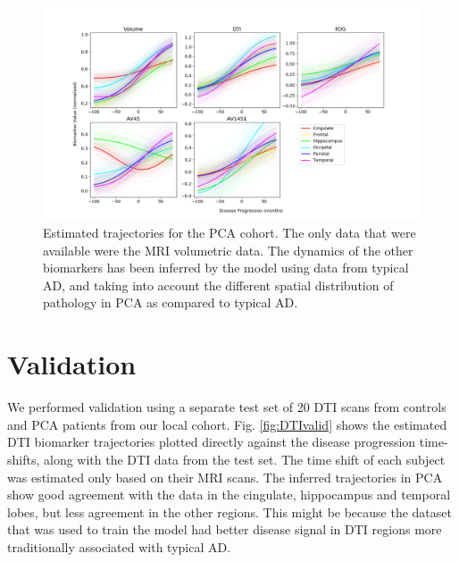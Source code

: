 \documentclass{llncs}
\begin{document}
\begin{figure}
 \includegraphics[width=\textwidth, trim=0 20 0 0, clip]{figures/trajDisSpaceOverlap_PCA_tad-drcTinyPen1_JMD.png}
 \caption{Estimated trajectories for the PCA cohort. The only data that were available were the MRI volumetric data. The dynamics of the other biomarkers has been inferred by the model using data from typical AD, and taking into account the different spatial distribution of pathology in PCA as compared to typical AD.}
 \label{fig:PCAtrajByModality}
\end{figure}


\section{Validation}

We performed validation using a separate test set of 20 DTI scans from controls and PCA patients from our local cohort. Fig. \ref{fig:DTIvalid} shows the estimated DTI biomarker trajectories plotted directly against the disease progression time-shifts, along with the DTI data from the test set. The time shift of each subject was estimated only based on their MRI scans. The inferred trajectories in PCA show good agreement with the data in the cingulate, hippocampus and temporal lobes, but less agreement in the other regions. This might be because the dataset that was used to train the model had better disease signal in DTI regions more traditionally associated with typical AD.

\end{document}
